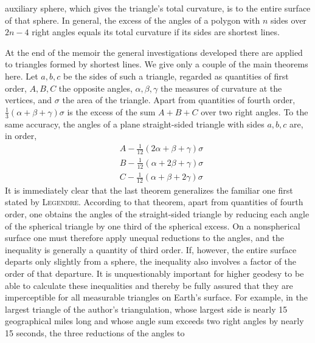 %
auxiliary sphere, which gives the triangle's total curvature, is to the entire surface of that sphere. In general, the excess of the angles of a polygon with \(n\) sides over \(2n-4\) right angles equals its total curvature if its sides are shortest lines.

At the end of the memoir the general investigations developed there are applied to triangles formed by shortest lines. We give only a couple of the main theorems here. Let \(a,b,c\) be the sides of such a triangle, regarded as quantities of first order, \(A,B,C\) the opposite angles, \(\alpha,\beta,\gamma\) the measures of curvature at the vertices, and \(\sigma\) the area of the triangle. Apart from quantities of fourth order, \(\tfrac13(\alpha+\beta+\gamma)\sigma\) is the excess of the sum \(A+B+C\) over two right angles. To the same accuracy, the angles of a plane straight-sided triangle with sides \(a,b,c\) are, in order,
\[
\begin{aligned}
&A-\tfrac1{12}(2\alpha+\beta+\gamma)\sigma\\
&B-\tfrac1{12}(\alpha+2\beta+\gamma)\sigma\\
&C-\tfrac1{12}(\alpha+\beta+2\gamma)\sigma
\end{aligned}
\]
It is immediately clear that the last theorem generalizes the familiar one first stated by \textsc{Legendre}. According to that theorem, apart from quantities of fourth order, one obtains the angles of the straight-sided triangle by reducing each angle of the spherical triangle by one third of the spherical excess. On a nonspherical surface one must therefore apply unequal reductions to the angles, and the inequality is generally a quantity of third order. If, however, the entire surface departs only slightly from a sphere, the inequality also involves a factor of the order of that departure. It is unquestionably important for higher geodesy to be able to calculate these inequalities and thereby be fully assured that they are imperceptible for all measurable triangles on Earth's surface. For example, in the largest triangle of the author's triangulation, whose largest side is nearly 15 geographical miles long and whose angle sum exceeds two right angles by nearly 15 seconds, the three reductions of the angles to %
